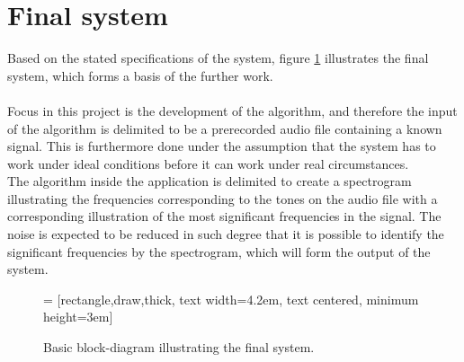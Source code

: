 \section{Final system}
Based on the stated specifications of the system, figure \ref{fig:system} illustrates the final system, which forms a basis of the further work. \\ \\
Focus in this project is the development of the algorithm, and therefore the input of the algorithm is delimited to be a prerecorded audio file containing a known signal. This is furthermore done under the assumption that the system has to work under ideal conditions before it can work under real circumstances. \\ 
The algorithm inside the application is delimited to create a spectrogram illustrating the frequencies corresponding to the tones on the audio file with a corresponding illustration of the most significant frequencies in the signal. The noise is expected to be reduced in such degree that it is possible to identify the significant frequencies by the spectrogram, which will form the output of the system. 
\begin{figure}[H]
\centering
\hspace*{-1cm}
 = [rectangle,draw,thick, text width=4.2em, text centered, minimum height=3em]
\caption{Basic block-diagram illustrating the final system.} 
\label{fig:system}
\end{figure}